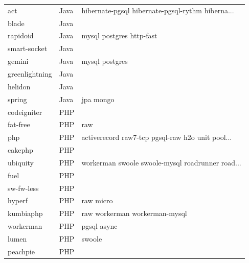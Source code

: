 \begin{longtable}{lll}
    act              & Java        & hibernate-pgsql hibernate-pgsql-rythm hiberna...   \\
    blade            & Java        &                                                    \\
    rapidoid         & Java        & mysql postgres http-fast                           \\
    smart-socket     & Java        &                                                    \\
    gemini           & Java        & mysql postgres                                     \\
    greenlightning   & Java        &                                                    \\
    helidon          & Java        &                                                    \\
    spring           & Java        & jpa mongo                                          \\
    codeigniter      & PHP         &                                                    \\
    fat-free         & PHP         & raw                                                \\
    php              & PHP         & activerecord raw7-tcp pgsql-raw h2o unit pool...   \\
    cakephp          & PHP         &                                                    \\
    ubiquity         & PHP         & workerman swoole swoole-mysql roadrunner road...   \\
    fuel             & PHP         &                                                    \\
    sw-fw-less       & PHP         &                                                    \\
    hyperf           & PHP         & raw micro                                          \\
    kumbiaphp        & PHP         & raw workerman workerman-mysql                      \\
    workerman        & PHP         & pgsql async                                        \\
    lumen            & PHP         & swoole                                             \\
    peachpie         & PHP         &                                                    \\

\end{longtable}
